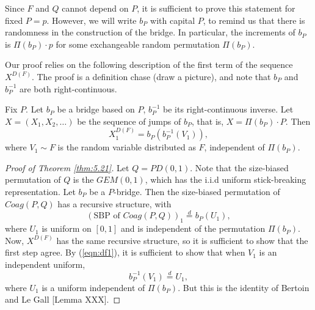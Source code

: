 Since $F$ and $Q$ cannot depend on $P$, it is sufficient to prove this statement for fixed $P = p$. However, we will write $b_P$ with capital $P$, to remind us that there is randomness in the construction of the bridge. In particular, the increments of $b_P$ is $\Pi(b_P) \cdot p$ for some exchangeable random permutation $\Pi(b_P)$.  

Our proof relies on the following description of the first term of the sequence $X^{D(F)}$. The proof is a definition chase (draw a picture), and note that $b_P$ and $b_P^{-1}$ are both right-continuous. 

\begin{lemma}
Fix $P$. Let $b_P$ be a bridge based on $P$, $b_P^{-1}$ be its right-continuous inverse. Let $X = (X_1, X_2, \ldots)$ be the sequence of jumps of $b_P$, that is, $X = \Pi(b_P) \cdot P$. Then 
\begin{equation}\label{eqn:df1}
X^{D(F)}_1 = b_P(b_P^{-1}(V_1)),
\end{equation}
where $V_1 \sim F$ is the random variable distributed as $F$, independent of $\Pi(b_P)$. %
\end{lemma}

\begin{proof}[Proof of Theorem \ref{thm:5.21}] 
Let $Q = PD(0,1)$. Note that the size-biased permutation of $Q$ is the $GEM(0,1)$, which has the i.i.d uniform stick-breaking representation. Let $b_P$ be a $P$-bridge.%
Then the size-biased permutation of $Coag(P,Q)$ has a recursive structure, with
$$ (\mbox{SBP of } Coag(P,Q))_1 \stackrel{d}{=} b_P(U_1), $$
where $U_1$ is uniform on $[0,1]$ and is independent of the permutation $\Pi(b_P)$. Now, $X^{D(F)}$ has the same recursive structure, so it is sufficient to show that the first step agree. By (\ref{eqn:df1}), it is sufficient to show that when $V_1$ is an independent uniform,  
$$b_P^{-1}(V_1) \stackrel{d}{=} U_1,$$
where $U_1$ is a uniform independent of $\Pi(b_P)$. But this is the identity of Bertoin and Le Gall \cite{bertoin44}[Lemma XXX].
\end{proof}
\begin{comment} 
\begin{lemma}[Bertoin and Le Gall, lemma XXX]
Let $P$ be a random exchangeable mass partition, $b_P$ be the corresponding bridge, $V_i$ be a sequence of i.i.d uniform$[0,1]$ random variables, independent of $b_P$. Let 
$\Pi \in \mathcal{P}_\mathbb{N}$ be the Kingman's paintbox based on $V_i$'s and $b_P$, that is, $i \stackrel{\Pi}{\sim} j$ if and only if $b_P(V_i) = b_P(V_j)$. Let
$$ U_i := b_P^{-1}(V_i). $$
Then $U_i$ is an i.i.d sequence of uniform$[0,1]$ random variables, independent of $\Pi$. 
\end{lemma}
\end{comment}






